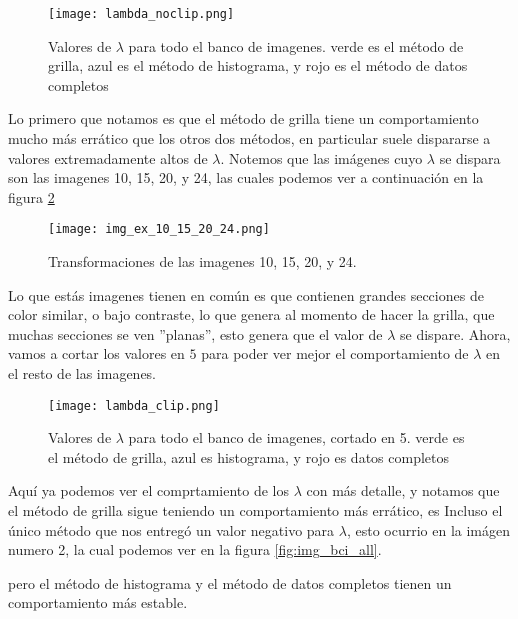     \begin{figure}[H]
        \centering
        \texttt{[image: lambda\_noclip.png]}
        \caption{Valores de $\lambda$ para todo el banco de imagenes. verde es el m\'etodo de grilla, azul es el m\'etodo de histograma, y rojo es el m\'etodo de datos completos}
        \label{fig:lambda_noclip}
    \end{figure}

    Lo primero que notamos es que el m\'etodo de grilla tiene un comportamiento mucho m\'as err\'atico que los otros dos m\'etodos, en particular suele dispararse a valores extremadamente altos de $\lambda$. Notemos que las im\'agenes cuyo $\lambda$ se dispara son las imagenes 10, 15, 20, y 24, las cuales podemos ver a continuaci\'on en la figura \ref{fig:img_bci_10_15_20}

    \begin{figure}[H]
        \centering
        \texttt{[image: img\_ex\_10\_15\_20\_24.png]}
        \caption{Transformaciones de las imagenes 10, 15, 20, y 24.}
        \label{fig:img_bci_10_15_20}
    \end{figure}

    Lo que est\'as imagenes tienen en com\'un es que contienen grandes secciones de color similar, o bajo contraste, lo que genera al momento de hacer la grilla, que muchas secciones se ven ''planas'', esto genera que el valor de $\lambda$ se dispare. Ahora, vamos a cortar los valores en $5$ para poder ver mejor el comportamiento de $\lambda$ en el resto de las imagenes.

    \begin{figure}[H]
        \centering
        \texttt{[image: lambda\_clip.png]}
        \caption{Valores de $\lambda$ para todo el banco de imagenes, cortado en 5. verde es el m\'etodo de grilla, azul es histograma, y rojo es datos completos}
        \label{fig:lambda_clip}
    \end{figure}

    Aqu\'i ya podemos ver el comprtamiento de los $\lambda$ con m\'as detalle, y notamos que el m\'etodo de grilla sigue teniendo un comportamiento m\'as err\'atico, es Incluso el \'unico m\'etodo que nos entreg\'o un valor negativo para $\lambda$, esto ocurrio en la im\'agen numero 2, la cual podemos ver en la figura \ref{fig:img_bci_all}.
    
    pero el m\'etodo de histograma y el m\'etodo de datos completos tienen un comportamiento m\'as estable. 
    
